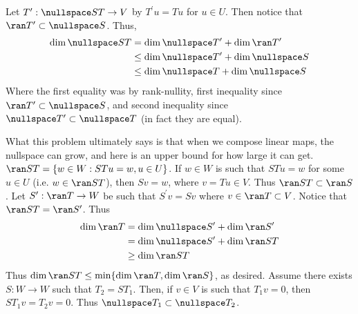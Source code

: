 \documentclass{book}
\begin{document}
\begin{enumerate}[label=\arabic*)]
      Let $T^\prime: \nullspace ST \to V$ by $T^\prime u = Tu$ for $u \in U$. Then notice that $\ran T^\prime \subset \nullspace S$. Thus,
      \begin{align*}
        \dim\nullspace ST & = \dim\nullspace T^\prime + \dim\ran T^\prime \\
        & \leq \dim\nullspace T^\prime + \dim\nullspace S \\
        & \leq \dim\nullspace T + \dim\nullspace S
      \end{align*}
      Where the first equality was by rank-nullity, first inequality since $\ran T^\prime \subset \nullspace S$, and second inequality since $\nullspace T^\prime \subset \nullspace T$ (in fact
      they are equal).

      What this problem ultimately says is that when we compose linear maps, the nullspace can grow, and here is an upper bound for how large it can get.
    \ii
      $\ran ST = \{w \in W: STu = w, u \in U\}$. If $w \in W$ is such that $STu = w$ for some $u \in U$ (i.e. $w \in \ran ST$), then $Sv = w$, where $v = Tu \in V$. Thus $\ran ST \subset
      \ran S$. Let $S^\prime: \ran T \to W$ be such that $S^\prime v = Sv$ where $v \in \ran T \subset V$. Notice that $\ran ST = \ran S^\prime$. Thus 
      \begin{align*}
        \dim\ran T & = \dim\nullspace S^\prime + \dim\ran S^\prime \\
        & = \dim\nullspace S^\prime + \dim\ran ST \\
        & \geq \dim\ran ST
      \end{align*}
      Thus $\dim\ran ST \leq \min\{\dim\ran T, \dim\ran S\}$, as desired.
    \ii
      Assume there exists $S: W \to W$ such that $T_2 = ST_1$. Then, if $v \in V$ is such that $T_1v = 0$, then $ST_1v = T_2v = 0$. Thus $\nullspace T_1 \subset \nullspace T_2$. 


\end{enumerate}
\end{document}
